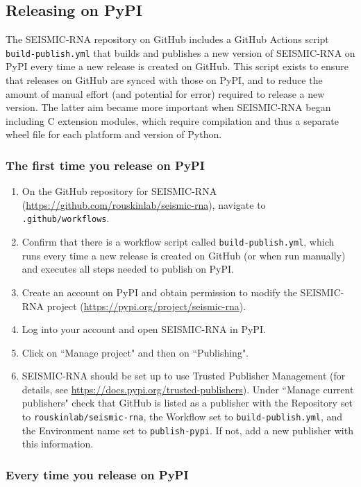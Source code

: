 \documentclass[main.tex]{subfiles}
\begin{document}
\subsection{Releasing on PyPI}

The SEISMIC-RNA repository on GitHub includes a GitHub Actions script \verb|build-publish.yml| that builds and publishes a new version of SEISMIC-RNA on PyPI every time a new release is created on GitHub. This script exists to ensure that releases on GitHub are synced with those on PyPI, and to reduce the amount of manual effort (and potential for error) required to release a new version. The latter aim became more important when SEISMIC-RNA began including C extension modules, which require compilation and thus a separate wheel file for each platform and version of Python.

\subsubsection{The first time you release on PyPI}

\begin{enumerate}
    \item On the GitHub repository for SEISMIC-RNA (\url{https://github.com/rouskinlab/seismic-rna}), navigate to \verb|.github/workflows|.
    \item Confirm that there is a workflow script called \verb|build-publish.yml|, which runs every time a new release is created on GitHub (or when run manually) and executes all steps needed to publish on PyPI.
    \item Create an account on PyPI and obtain permission to modify the SEISMIC-RNA project (\url{https://pypi.org/project/seismic-rna}).
    \item Log into your account and open SEISMIC-RNA in PyPI.
    \item Click on ``Manage project" and then on ``Publishing".
    \item SEISMIC-RNA should be set up to use Trusted Publisher Management (for details, see \url{https://docs.pypi.org/trusted-publishers}). Under ``Manage current publishers" check that GitHub is listed as a publisher with the Repository set to \verb|rouskinlab/seismic-rna|, the Workflow set to \verb|build-publish.yml|, and the Environment name set to \verb|publish-pypi|. If not, add a new publisher with this information.
\end{enumerate}


\subsubsection{Every time you release on PyPI}
\end{document}
